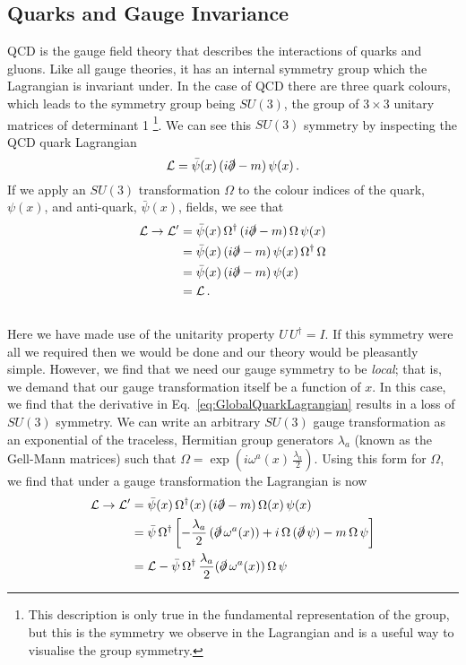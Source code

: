 \subsection{Quarks and Gauge Invariance}
QCD is the gauge field theory that describes the interactions of quarks and gluons. Like all gauge theories, it has an internal symmetry group which the Lagrangian is invariant under. In the case of QCD there are three quark colours, which leads to the symmetry group being $SU(3)$, the group of $3\times 3$ unitary matrices of determinant 1 \footnote{This description is only true in the fundamental representation of the group, but this is the symmetry we observe in the Lagrangian and is a useful way to visualise the group symmetry.}. We can see this $SU(3)$ symmetry by inspecting the QCD quark Lagrangian
%
\begin{equation}
\mathcal{L} = \bar{\psi}(x)\,(i\slashed{\partial}-m)\,\psi(x)\,.
\label{eq:GlobalQuarkLagrangian}
\end{equation}
%
If we apply an $SU(3)$ transformation $\Omega$ to the colour indices of the quark, $\psi (x)$, and anti-quark, $\bar{\psi} (x)$, fields, we see that
%
\begin{align*}
\mathcal{L}\rightarrow\mathcal{L'}&=\bar{\psi}(x)\,\Omega^\dag\,(i\slashed{\partial}-m)\,\Omega\,\psi(x)\\
&= \bar{\psi}(x)\,(i\slashed{\partial}-m)\,\psi(x)\,\Omega^\dag\,\Omega\\
&= \bar{\psi}(x)\,(i\slashed{\partial}-m)\,\psi(x)\\
&= \mathcal{L}\, .
\end{align*}\\
%
Here we have made use of the unitarity property $U\,U^\dag = I$. If this symmetry were all we required then we would be done and our theory would be pleasantly simple. However, we find that we need our gauge symmetry to be \textit{local}; that is, we demand that our gauge transformation itself be a function of $x$\cite{peskin2018introduction}. In this case, we find that the derivative in Eq.~\ref{eq:GlobalQuarkLagrangian} results in a loss of $SU(3)$ symmetry. We can write an arbitrary $SU(3)$ gauge transformation as an exponential of the traceless, Hermitian group generators $\lambda_a$ (known as the Gell-Mann matrices) such that $\Omega=\exp\left(i\omega^a(x)\,\frac{\lambda_a}{2}\right)$. Using this form for $\Omega$, we find that under a gauge transformation the Lagrangian is now
%
\begin{align}
\mathcal{L}\rightarrow\mathcal{L'}&=\bar{\psi}(x)\,\Omega^\dag(x)\,(i\slashed{\partial}-m)\,\Omega(x)\,\psi(x)\nonumber\\
&=\bar{\psi}\,\Omega^\dag\left[-\frac{\lambda_a}{2}\,(\slashed{\partial}\,\omega^a(x))+i\,\Omega\,(\slashed{\partial}\,\psi)-m\,\Omega\,\psi\right]\nonumber\\
&= \mathcal{L}-\bar{\psi}\,\Omega^\dag\,\frac{\lambda_a}{2}(\slashed{\partial}\,\omega^a(x))\,\Omega\,\psi
\label{eq:LocalTrans}
\end{align}
